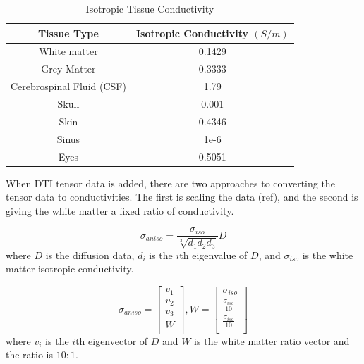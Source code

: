\begin{table}[]
\centering
\caption{Isotropic Tissue Conductivity}
\label{tab:cond}
\begin{tabular}{|c|c|}
\hline
Tissue Type               & Isotropic Conductivity $(S/m)$ \\ \hline
White matter              & 0.1429                         \\ \hline
Grey Matter               & 0.3333                         \\ \hline
Cerebrospinal Fluid (CSF) & 1.79                           \\ \hline
Skull                     & 0.001                          \\ \hline
Skin                      & 0.4346                         \\ \hline
Sinus                     & 1e-6                           \\ \hline
Eyes                      & 0.5051                         \\ \hline
\end{tabular}
\end{table}

When DTI tensor data is added, there are two approaches to converting the tensor data to conductivities. The first is scaling the data (ref), and the second is giving the white matter a fixed ratio of conductivity. 

\begin{equation}
\sigma_{aniso} = \frac{\sigma_{iso}}{\sqrt[3]{d_1d_2d_3}}D
\end{equation}
where $D$ is the diffusion data, $d_i$ is the $i$th eigenvalue of $D$, and $\sigma_{iso}$ is the white matter isotropic conductivity.

\begin{equation}
\sigma_{aniso} = \begin{bmatrix}
v_1\\
v_2\\
v_3\\
W\\
\end{bmatrix}, 
W = \begin{bmatrix}
\sigma_{iso}\\
\frac{\sigma_{iso}}{10}\\
\frac{\sigma_{iso}}{10}\\
\end{bmatrix}
\end{equation}
where $v_i$ is the $i$th eigenvector of $D$ and $W$ is the white matter ratio vector and the ratio is $10:1$.

